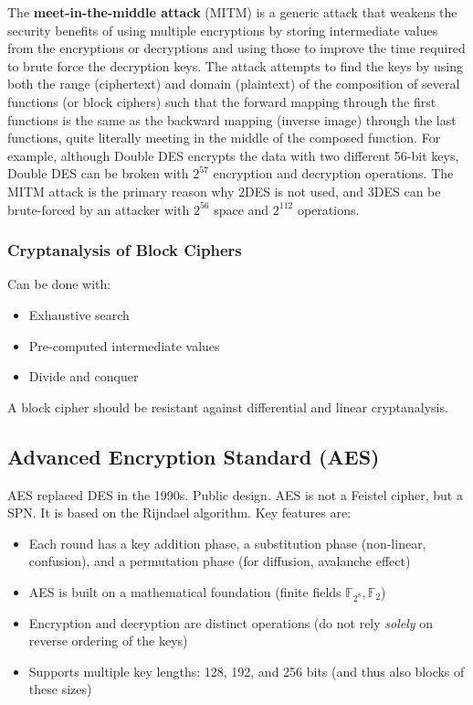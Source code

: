 The \textbf{meet-in-the-middle attack} (MITM) is a generic attack that weakens the security benefits of using multiple encryptions by storing intermediate values from the encryptions or decryptions and using those to improve the time required to brute force the decryption keys. 
The attack attempts to find the keys by using both the range (ciphertext) and domain (plaintext) of the composition of several functions (or block ciphers) such that the forward mapping through the first functions is the same as the backward mapping (inverse image) through the last functions, quite literally meeting in the middle of the composed function. For example, although Double DES encrypts the data with two different 56-bit keys, Double DES can be broken with $2^{57}$ encryption and decryption operations.
The MITM attack is the primary reason why 2DES is not used, and 3DES can be brute-forced by an attacker with $2^{56}$ space and $2^{112}$ operations.


\subsubsection{Cryptanalysis of Block Ciphers}
Can be done with:
\begin{itemize}
    \item Exhaustive search
    \item Pre-computed intermediate values
    \item Divide and conquer
\end{itemize}

A block cipher should be resistant against differential and linear cryptanalysis. 

\subsection{Advanced Encryption Standard (AES)}
AES replaced DES in the 1990s. Public design. AES is not a Feistel cipher, but a SPN. It is based on the Rijndael algorithm. Key features are:
\begin{itemize}
    \item Each round has a key addition phase, a substitution phase (non-linear, confusion), and a permutation phase (for diffusion, avalanche effect)
    \item AES is built on a mathematical foundation (finite fields $\mathbb{F}_{2^8}, \mathbb{F}_2$)
    \item Encryption and decryption are distinct operations (do not rely \emph{solely} on reverse ordering of the keys)
    \item Supports multiple key lengths: 128, 192, and 256 bits (and thus also blocks of these sizes)
\end{itemize}


